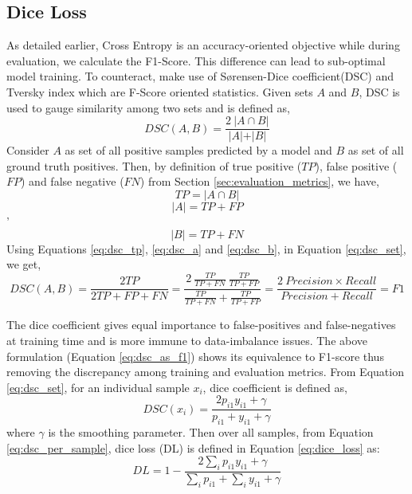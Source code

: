 \subsection{Dice Loss}
As detailed earlier, Cross Entropy is an accuracy-oriented objective while during evaluation, we calculate the F1-Score. This difference can lead to sub-optimal model training. To counteract, \cite{li2019dice} make use of S{\o}rensen-Dice coefficient(DSC)\cite{sorensen1948method, dice1945measures} and Tversky index\cite{tversky1977features} which are F-Score oriented statistics. Given sets $A$ and $B$, DSC is used to gauge similarity among two sets and is defined as,
\begin{equation}
\label{eq:dsc_set}
    DSC(A, B) = \frac{2\ \vert A \cap B \vert}{\vert A \vert + \vert B \vert}
\end{equation}
Consider $A$ as set of all positive samples predicted by a model and $B$ as set of all ground truth positives. Then, by definition of true positive ($TP$), false positive ($FP$) and false negative ($FN$) from Section \ref{sec:evaluation_metrics}, we have,
\begin{equation}
\label{eq:dsc_tp}
    TP = \vert A \cap B \vert
\end{equation}
\begin{equation}
\label{eq:dsc_a}
    \vert A \vert = TP + FP
\end{equation}'
\begin{equation}
\label{eq:dsc_b}
    \vert B \vert = TP + FN
\end{equation}
Using Equations \ref{eq:dsc_tp}, \ref{eq:dsc_a} and \ref{eq:dsc_b}, in Equation \ref{eq:dsc_set}, we get,
\begin{equation}
\label{eq:dsc_as_f1}
     DSC(A, B) = \frac{2TP}{2TP + FP + FN} = \frac{2\ \frac{TP}{TP + FN}\ \frac{TP}{TP + FP}}{\frac{TP}{TP + FN} + \frac{TP}{TP + FP}} = \frac{2\ Precision \times Recall}{Precision + Recall} = F1
\end{equation}

The dice coefficient gives equal importance to false-positives and false-negatives at training time and is more immune to data-imbalance issues\cite{sudre2017generalised, shen2018influence, kodym2018segmentation}. The above formulation (Equation \ref{eq:dsc_as_f1}) shows its equivalence to F1-score thus removing the discrepancy among training and evaluation metrics. From Equation \ref{eq:dsc_set}, for an individual sample $x_i$, dice coefficient is defined as,
\begin{equation}
\label{eq:dsc_per_sample}
    DSC(x_i) = \frac{2p_{i1}y_{i1} + \gamma}{p_{i1} + y_{i1} + \gamma}
\end{equation}
where $\gamma$ is the smoothing parameter. Then over all samples, from Equation \ref{eq:dsc_per_sample}, dice loss (DL) is defined in Equation \ref{eq:dice_loss} as:
\begin{equation}
\label{eq:dice_loss}
    DL = 1 - \frac{2\sum_i{p_{i1}y_{i1}} + \gamma}{\sum_i{p_{i1}} + \sum_i{y_{i1}} + \gamma}
\end{equation}

